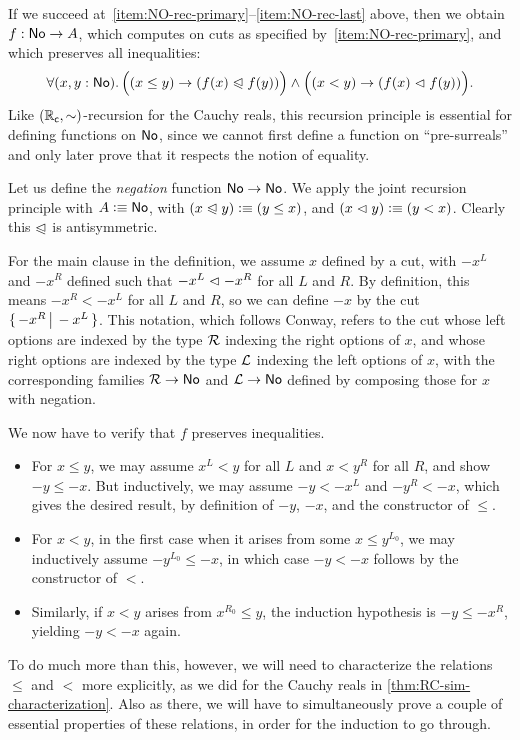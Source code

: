 If we succeed at~\ref{item:NO-rec-primary}--\ref{item:NO-rec-last} above, then we obtain $f:\mathsf{No}\to A$, which computes on cuts as specified by~\ref{item:NO-rec-primary}, and which preserves all inequalities:
\[ \fall{x,y:\NO}\Big((x\le y) \to (f(x)\ble f(y))\Big) \land\Big((x< y) \to (f(x)\blt f(y))\Big).\]
Like $(\mathbb{R}_\mathsf{c},\sim)$-recursion for the Cauchy reals, this recursion principle is essential for defining functions on $\mathsf{No}$, since we cannot first define a function on ``pre-surreals'' and only later prove that it respects the notion of equality.

\begin{eg}
  Let us define the \emph{negation} function $\mathsf{No}\to\mathsf{No}$.
  We apply the joint recursion principle with $A\vcentcolon\equiv\mathsf{No}$, with $(x\trianglelefteqslant y)\vcentcolon\equiv (y\le x)$, and $(x\vartriangleleft y)\vcentcolon\equiv (y< x)$.
  Clearly this $\trianglelefteqslant$ is antisymmetric.

  For the main clause in the definition, we assume $x$ defined by a cut, with $-x^L$ and $-x^R$ defined such that $-x^L \vartriangleleft -x^R$ for all $L$ and $R$.
  By definition, this means $-x^R< -x^L$ for all $L$ and $R$, so we can define $-x$ by the cut $\{\,-x^R\,\big|\,-x^L\,\}$.
  This notation, which follows Conway, refers to the cut whose left options are indexed by the type $\mathcal{R}$ indexing the right options of $x$, and whose right options are indexed by the type $\mathcal{L}$ indexing the left options of $x$, with the corresponding families $\mathcal{R}\to\mathsf{No}$ and $\mathcal{L}\to\mathsf{No}$ defined by composing those for $x$ with negation.

  We now have to verify that $f$ preserves inequalities.
  \begin{itemize}
  \item For $x\le y$, we may assume $x^L<y$ for all $L$ and $x < y^R$ for all $R$, and show $-y\le -x$.
    But inductively, we may assume $-y <-x^L$ and $-y^R<-x$, which gives the desired result, by definition of $-y$, $-x$, and the constructor of $\le$.
  \item For $x<y$, in the first case when it arises from some $x\le y^{L_0}$, we may inductively assume $-y^{L_0} \le -x$, in which case $-y<-x$ follows by the constructor of $<$.
  \item Similarly, if $x<y$ arises from $x^{R_0}\le y$, the induction hypothesis is $-y \le -x^R$, yielding $-y<-x$ again.
  \end{itemize}
\end{eg}

To do much more than this, however, we will need to characterize the relations $\le$ and $<$ more explicitly, as we did for the Cauchy reals in \autoref{thm:RC-sim-characterization}.
Also as there, we will have to simultaneously prove a couple of essential properties of these relations, in order for the induction to go through.

